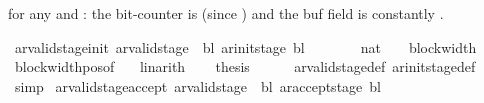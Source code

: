 \begin{isabellebody}
\begin{isamarkuptext}
   for any \isa{{\isasymGamma}}
  and : the bit-counter is 
  (since ) and the buf field is constantly
  .%
\end{isamarkuptext}\isamarkuptrue%
\isamarkupfalse%
\ ar{\isacharunderscore}{\kern0pt}valid{\isacharunderscore}{\kern0pt}stage{\isacharunderscore}{\kern0pt}init{\isacharcolon}{\kern0pt}\ {\isachardoublequoteopen}ar{\isacharunderscore}{\kern0pt}valid{\isacharunderscore}{\kern0pt}stage\ {\isasymGamma}\ bl\ {\isacharparenleft}{\kern0pt}ar{\isacharunderscore}{\kern0pt}init{\isacharunderscore}{\kern0pt}stage\ bl{\isacharparenright}{\kern0pt}{\isachardoublequoteclose}\isanewline
%
\isadelimproof
%
\endisadelimproof
%
\isatagproof
{}\isamarkupfalse%
\ {\isacharminus}{\kern0pt}\isanewline
\ \ \isamarkupfalse%
\ {\isachardoublequoteopen}{\isacharparenleft}{\kern0pt}{}\ {\isacharcolon}{\kern0pt}{\isacharcolon}{\kern0pt}\ nat{\isacharparenright}{\kern0pt}\ {\isacharless}{\kern0pt}\ {}\ {\isacharasterisk}{\kern0pt}\ block{\isacharunderscore}{\kern0pt}width\ {\isasymGamma}{\isachardoublequoteclose}\ \isamarkupfalse%
\ block{\isacharunderscore}{\kern0pt}width{\isacharunderscore}{\kern0pt}pos{\isacharbrackleft}{\kern0pt}of\ {\isasymGamma}{\isacharbrackright}{\kern0pt}\ \isamarkupfalse%
\ linarith\isanewline
\ \ \isamarkupfalse%
\ {\isacharquery}{\kern0pt}thesis\isanewline
\ \ \ \ \isamarkupfalse%
\ ar{\isacharunderscore}{\kern0pt}valid{\isacharunderscore}{\kern0pt}stage{\isacharunderscore}{\kern0pt}def\ ar{\isacharunderscore}{\kern0pt}init{\isacharunderscore}{\kern0pt}stage{\isacharunderscore}{\kern0pt}def\ \isamarkupfalse%
\ simp\isanewline
{}\isamarkupfalse%
%
\endisatagproof
{\isafoldproof}%
%
\isadelimproof
\isanewline
%
\endisadelimproof
\isanewline
{}\isamarkupfalse%
\ ar{\isacharunderscore}{\kern0pt}valid{\isacharunderscore}{\kern0pt}stage{\isacharunderscore}{\kern0pt}accept{\isacharcolon}{\kern0pt}\ {\isachardoublequoteopen}ar{\isacharunderscore}{\kern0pt}valid{\isacharunderscore}{\kern0pt}stage\ {\isasymGamma}\ bl\ {\isacharparenleft}{\kern0pt}ar{\isacharunderscore}{\kern0pt}accept{\isacharunderscore}{\kern0pt}stage\ bl{\isacharparenright}{\kern0pt}{\isachardoublequoteclose}\isanewline

\end{isabellebody}
